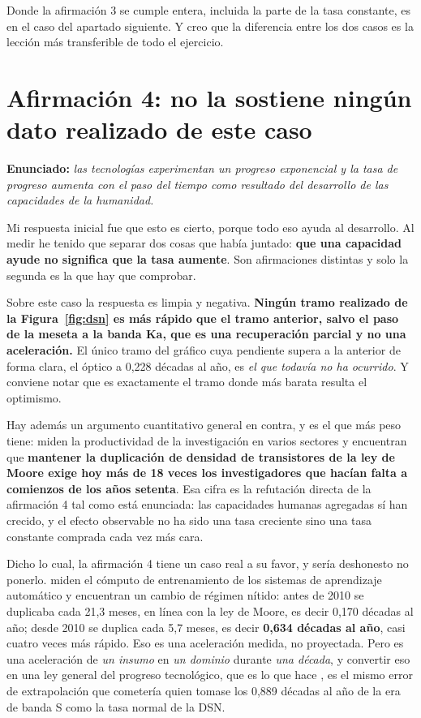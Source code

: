 \documentclass[11pt,letterpaper]{article}
\begin{document}
Donde la afirmación 3 se cumple entera, incluida la parte de la tasa constante,
es en el caso del apartado siguiente. Y creo que la diferencia entre los dos
casos es la lección más transferible de todo el ejercicio.

\section{Afirmación 4: no la sostiene ningún dato realizado de este caso}
\label{sec:af4}

\textbf{Enunciado:} \emph{las tecnologías experimentan un progreso exponencial
y la tasa de progreso aumenta con el paso del tiempo como resultado del
desarrollo de las capacidades de la humanidad.}

Mi respuesta inicial fue que esto es cierto, porque todo eso ayuda al
desarrollo. Al medir he tenido que separar dos cosas que había juntado:
\textbf{que una capacidad ayude no significa que la tasa aumente}. Son
afirmaciones distintas y solo la segunda es la que hay que comprobar.

Sobre este caso la respuesta es limpia y negativa. \textbf{Ningún tramo
realizado de la Figura~\ref{fig:dsn} es más rápido que el tramo anterior,
salvo el paso de la meseta a la banda Ka, que es una recuperación parcial y no
una aceleración.} El único tramo del gráfico cuya pendiente supera a la
anterior de forma clara, el óptico a 0,228 décadas al año, es \emph{el que
todavía no ha ocurrido}. Y conviene notar que es exactamente el tramo donde
más barata resulta el optimismo.

Hay además un argumento cuantitativo general en contra, y es el que más peso
tiene: \textcite{bloom2020} miden la productividad de la investigación en
varios sectores y encuentran que \textbf{mantener la duplicación de densidad
de transistores de la ley de Moore exige hoy más de 18 veces los
investigadores que hacían falta a comienzos de los años setenta}. Esa cifra es
la refutación directa de la afirmación 4 tal como está enunciada: las
capacidades humanas agregadas sí han crecido, y el efecto observable no ha
sido una tasa creciente sino una tasa constante comprada cada vez más cara.

Dicho lo cual, la afirmación 4 tiene un caso real a su favor, y sería
deshonesto no ponerlo. \textcite{sevilla2022} miden el cómputo de entrenamiento
de los sistemas de aprendizaje automático y encuentran un cambio de régimen
nítido: antes de 2010 se duplicaba cada 21,3 meses, en línea con la ley de
Moore, es decir 0,170 décadas al año; desde 2010 se duplica cada 5,7 meses, es
decir \textbf{0,634 décadas al año}, casi cuatro veces más rápido. Eso es una
aceleración medida, no proyectada. Pero es una aceleración de \emph{un insumo}
en \emph{un dominio} durante \emph{una década}, y convertir eso en una ley
general del progreso tecnológico, que es lo que hace \textcite{kurzweil2001},
es el mismo error de extrapolación que cometería quien tomase los 0,889
décadas al año de la era de banda S como la tasa normal de la DSN.
\end{document}

